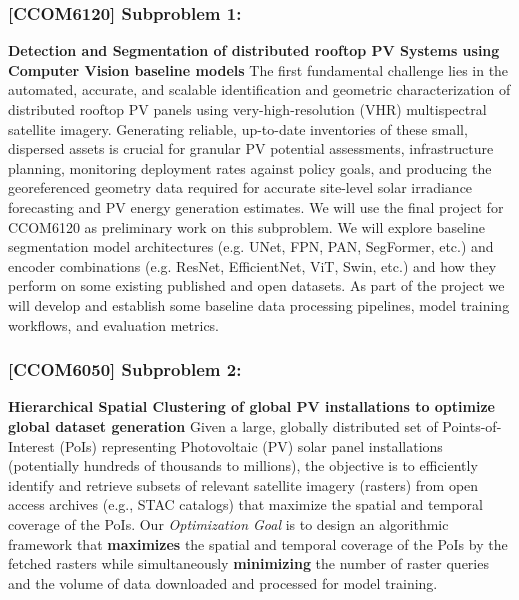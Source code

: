 \subsubsection{[CCOM6120] Subproblem 1:}
    \textbf{Detection and Segmentation of distributed rooftop PV Systems using Computer Vision baseline models} 
    The first fundamental challenge lies in the automated, accurate, and scalable identification and geometric characterization of distributed rooftop PV panels using very-high-resolution (VHR) multispectral satellite imagery. 
    Generating reliable, up-to-date inventories of these small, dispersed assets is crucial for granular PV potential assessments\cite{Pueblas_workflow_rooftop_PV_assessment_sat_img_2023}\cite{Jiang_rooftop_pv_assessment_2022}, infrastructure planning, 
    monitoring deployment rates against policy goals\cite{de-Hoog_sota_survey_2020}, and producing the georeferenced geometry data required for accurate site-level solar irradiance forecasting and PV energy generation estimates\cite{Bansal_ssl_nowcasting_2022}.
    We will use the final project for CCOM6120 as preliminary work on this subproblem. We will explore baseline segmentation model architectures (e.g. UNet, FPN, PAN, SegFormer, etc.) and 
    encoder combinations (e.g. ResNet, EfficientNet, ViT, Swin, etc.) and how they perform on some existing published and open datasets. As part of the project we will develop and establish some baseline data processing pipelines, model training workflows, and evaluation metrics.

    \clearpage

\subsubsection{[CCOM6050] Subproblem 2:} 
    \textbf{Hierarchical Spatial Clustering of global PV installations to optimize global dataset generation} 
    Given a large, globally distributed set of Points-of-Interest (PoIs) representing Photovoltaic (PV) solar panel installations (potentially hundreds of thousands to millions), 
    the objective is to efficiently identify and retrieve subsets of relevant satellite imagery (rasters) from open access archives (e.g., STAC catalogs) that maximize the spatial and temporal coverage of the PoIs. 
    Our \textit{Optimization Goal} is to design an algorithmic framework that \textbf{maximizes} the spatial and temporal coverage of the PoIs by the fetched rasters while simultaneously 
    \textbf{minimizing} the number of raster queries and the volume of data downloaded and processed for model training. 

